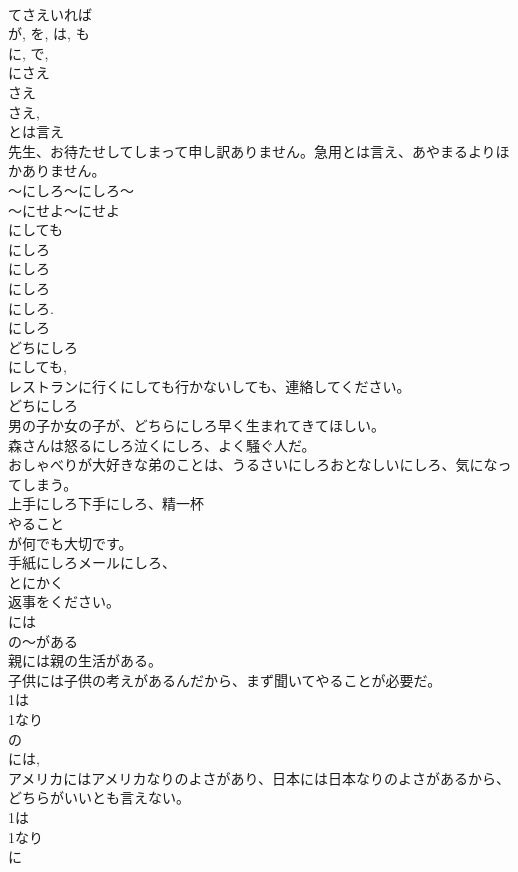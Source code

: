 \documentclass[8pt]{extreport}
\begin{document}
\begin{CJK}{UTF8}{min}
\\	てさえいれば
\\	が, を, は, も 
\\	に, で, 
\\	にさえ
\\	さえ 
\\	さえ, 
\\	とは言え
\\	先生、お待たせしてしまって申し訳ありません。急用とは言え、あやまるよりほかありません。　
\\	～にしろ～にしろ～
\\	～にせよ～にせよ
\\	にしても 
\\	にしろ
\\	にしろ 
\\	にしろ
\\	にしろ. 
\\	にしろ 
\\	どちにしろ 
\\	にしても, 
\\	レストランに行くにしても行かないしても、連絡してください。
\\	どちにしろ 
\\	男の子か女の子が、どちらにしろ早く生まれてきてほしい。
\\	森さんは怒るにしろ泣くにしろ、よく騒ぐ人だ。
\\	おしゃべりが大好きな弟のことは、うるさいにしろおとなしいにしろ、気になってしまう。
\\	上手にしろ下手にしろ、精一杯
\\	やること
\\	が何でも大切です。
\\	手紙にしろメールにしろ、
\\	とにかく
\\	返事をください。
\\	には
\\	の～がある
\\	親には親の生活がある。
\\	子供には子供の考えがあるんだから、まず聞いてやることが必要だ。
\\	1は
\\	1なり
\\	の
\\	には, 
\\	アメリカにはアメリカなりのよさがあり、日本には日本なりのよさがあるから、どちらがいいとも言えない。
\\	1は
\\	1なり
\\	に

\end{CJK}
\end{document}
